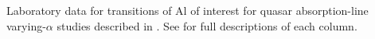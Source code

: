 Laboratory data for transitions of Al of interest for quasar absorption-line varying-$\alpha$ studies described in . See  for full descriptions of each column.
